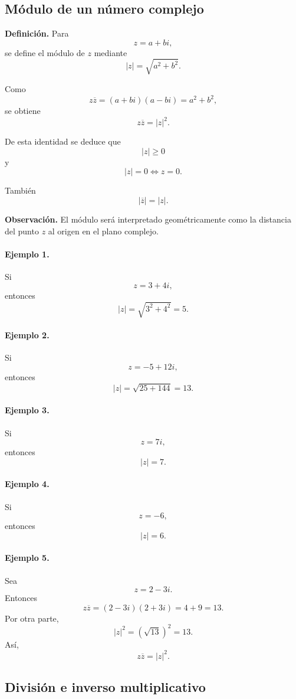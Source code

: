 \subsection{Módulo de un número complejo}

\textbf{Definición.}
Para
\[
z=a+bi,
\]
se define el módulo de $z$ mediante
\[
\boxed{
|z|=\sqrt{a^2+b^2}.
}
\]

Como
\[
z\overline z
=
(a+bi)(a-bi)
=
a^2+b^2,
\]
se obtiene
\[
\boxed{
z\overline z=|z|^2.
}
\]

De esta identidad se deduce que
\[
|z|\geq 0
\]
y
\[
\boxed{|z|=0\iff z=0.}
\]

También
\[
|\overline z|=|z|.
\]

\textbf{Observación.}
El módulo será interpretado geométricamente como la distancia del punto
$z$ al origen en el plano complejo.

\paragraph{Ejemplo 1.}
Si
\[
z=3+4i,
\]
entonces
\[
|z|=\sqrt{3^2+4^2}=5.
\]

\paragraph{Ejemplo 2.}
Si
\[
z=-5+12i,
\]
entonces
\[
|z|=\sqrt{25+144}=13.
\]

\paragraph{Ejemplo 3.}
Si
\[
z=7i,
\]
entonces
\[
|z|=7.
\]

\paragraph{Ejemplo 4.}
Si
\[
z=-6,
\]
entonces
\[
|z|=6.
\]

\paragraph{Ejemplo 5.}
Sea
\[
z=2-3i.
\]
Entonces
\[
z\overline z
=
(2-3i)(2+3i)
=
4+9
=
13.
\]
Por otra parte,
\[
|z|^2
=
(\sqrt{13})^2
=
13.
\]
Así,
\[
z\overline z=|z|^2.
\]

\subsection{División e inverso multiplicativo}


